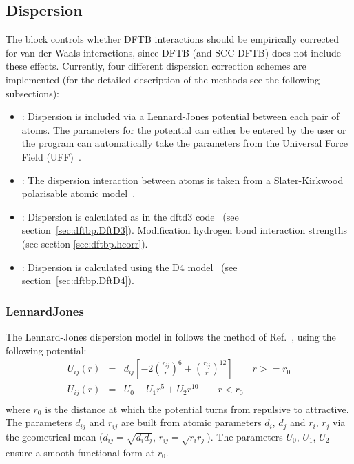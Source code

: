 \subsection{Dispersion}
\label{sec:dftbp.Dispersion}

The  block controls whether DFTB interactions should be
empirically corrected for van der Waals interactions, since DFTB (and
SCC-DFTB) does not include these effects. Currently, four different
dispersion correction schemes are implemented (for the detailed
description of the methods see the following subsections):
\begin{itemize}
\item {}: Dispersion is included via a Lennard-Jones
  potential between each pair of atoms. The parameters for the
  potential can either be entered by the user or the program can
  automatically take the parameters from the Universal Force Field
  (UFF)~\cite{rappe-JACS-114-10024}.
\item {}: The dispersion interaction between atoms is
  taken from a Slater-Kirkwood polarisable atomic
  model~\cite{elstner-jcp-114-5149}.
\item {}: Dispersion is calculated as in the dftd3
  code~\cite{grimme-jcp-132-154104,grimme-jcp-32-1456-1465} (see
  section~\ref{sec:dftbp.DftD3}). Modification hydrogen bond interaction
  strengths (see section \ref{sec:dftbp.hcorr}).
\item {}: Dispersion is calculated using the D4
  model~\cite{caldweyher-jcp-147-034112,caldeweyher-jcp-150-154122} (see
  section~\ref{sec:dftbp.DftD4}).
\end{itemize}

\subsubsection{LennardJones}
\label{sec:dftbp.LennardJones}

The Lennard-Jones dispersion model in \dftbp{} follows the method of
Ref.~\cite{zhechkov-JCTC-1-841}, using the following potential:
\begin{eqnarray*}
U_{ij}(r)&=&d_{ij}\left[-2\left(\frac{r_{ij}}{r}\right)^6 +
  \left(\frac{r_{ij}}{r}\right)^{12}\right]\qquad r >= r_0\\
U_{ij}(r)&=&U_0 + U_1 r^5 + U_2 r^{10}\qquad r < r_0\\
\end{eqnarray*}
where $r_0$ is the distance at which the potential turns from
repulsive to attractive. The parameters $d_{ij}$ and $r_{ij}$ are
built from atomic parameters $d_i$, $d_j$ and $r_i$, $r_j$ via the
geometrical mean ($d_{ij} = \sqrt{d_id_j}$,
$r_{ij}=\sqrt{r_ir_j}$). The parameters $U_0$, $U_1$, $U_2$ ensure a
smooth functional form at $r_0$.

